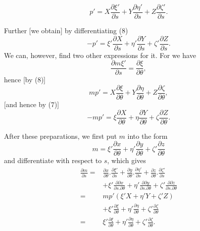 %
\[
p'=X\frac{\partial\xi'}{\partial s}+Y\frac{\partial\eta'}{\partial s}+Z\frac{\partial\zeta'}{\partial s}.
\]

Further [we obtain] by differentiating (8)
\[
-p'=\xi'\frac{\partial X}{\partial s}+\eta'\frac{\partial Y}{\partial s}+\zeta'\frac{\partial Z}{\partial s}.
\]
We can, however, find two other expressions for it. For we have
\[
\frac{\partial m\xi'}{\partial s}=\frac{\partial\xi}{\partial\theta},
\]
hence [by (8)]
\[
mp'=X\frac{\partial\xi}{\partial\theta}+Y\frac{\partial\eta}{\partial\theta}+Z\frac{\partial\zeta}{\partial\theta},
\]
[and hence by (7)]
\[
-mp'=\xi\frac{\partial X}{\partial\theta}+\eta\frac{\partial Y}{\partial\theta}+\zeta\frac{\partial Z}{\partial\theta}.
\]

After these preparations, we first put $m$ into the form
\[
m=\xi'\frac{\partial x}{\partial\theta}+\eta'\frac{\partial y}{\partial\theta}+\zeta'\frac{\partial z}{\partial\theta}
\]
and differentiate with respect to $s$, which gives
\[
\begin{aligned}
\frac{\partial m}{\partial s}={}&\frac{\partial x}{\partial\theta}.\frac{\partial\xi'}{\partial s}+\frac{\partial y}{\partial\theta}.\frac{\partial\eta'}{\partial s}+\frac{\partial z}{\partial\theta}.\frac{\partial\zeta'}{\partial s}\\
&+\xi'\frac{\partial\partial x}{\partial s.\partial\theta}+\eta'\frac{\partial\partial y}{\partial s.\partial\theta}+\zeta'\frac{\partial\partial z}{\partial s.\partial\theta}\\
={}&mp'(\xi'X+\eta'Y+\zeta'Z)\\
&+\xi'\frac{\partial\xi}{\partial\theta}+\eta'\frac{\partial\eta}{\partial\theta}+\zeta'\frac{\partial\zeta}{\partial\theta}\\
={}&\xi'\frac{\partial\xi}{\partial\theta}+\eta'\frac{\partial\eta}{\partial\theta}+\zeta'\frac{\partial\zeta}{\partial\theta}.
\end{aligned}
\]
